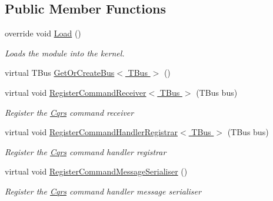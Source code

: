 \subsection*{Public Member Functions}
\begin{DoxyCompactItemize}
\item 
override void \hyperlink{classCqrs_1_1Ninject_1_1Azure_1_1ServiceBus_1_1CommandBus_1_1Configuration_1_1AzureCommandBusReceiverModule_a61b7d4b1fbabc6b1e4d8943f55116a51}{Load} ()
\begin{DoxyCompactList}\small\item\em Loads the module into the kernel. \end{DoxyCompactList}\item 
virtual T\+Bus \hyperlink{classCqrs_1_1Ninject_1_1Azure_1_1ServiceBus_1_1CommandBus_1_1Configuration_1_1AzureCommandBusReceiverModule_a02ed26e1f091dc077449dbd3c76305f7}{Get\+Or\+Create\+Bus$<$ T\+Bus $>$} ()
\item 
virtual void \hyperlink{classCqrs_1_1Ninject_1_1Azure_1_1ServiceBus_1_1CommandBus_1_1Configuration_1_1AzureCommandBusReceiverModule_ad8a7eb743b41cb901444922a3d458695}{Register\+Command\+Receiver$<$ T\+Bus $>$} (T\+Bus bus)
\begin{DoxyCompactList}\small\item\em Register the \hyperlink{namespaceCqrs}{Cqrs} command receiver \end{DoxyCompactList}\item 
virtual void \hyperlink{classCqrs_1_1Ninject_1_1Azure_1_1ServiceBus_1_1CommandBus_1_1Configuration_1_1AzureCommandBusReceiverModule_a66eb0005a2639fbf33d9a9ade7ed2c8e}{Register\+Command\+Handler\+Registrar$<$ T\+Bus $>$} (T\+Bus bus)
\begin{DoxyCompactList}\small\item\em Register the \hyperlink{namespaceCqrs}{Cqrs} command handler registrar \end{DoxyCompactList}\item 
virtual void \hyperlink{classCqrs_1_1Ninject_1_1Azure_1_1ServiceBus_1_1CommandBus_1_1Configuration_1_1AzureCommandBusReceiverModule_a4a068e214a9adee012fa16365d8d2fe7}{Register\+Command\+Message\+Serialiser} ()
\begin{DoxyCompactList}\small\item\em Register the \hyperlink{namespaceCqrs}{Cqrs} command handler message serialiser \end{DoxyCompactList}\end{DoxyCompactItemize}


